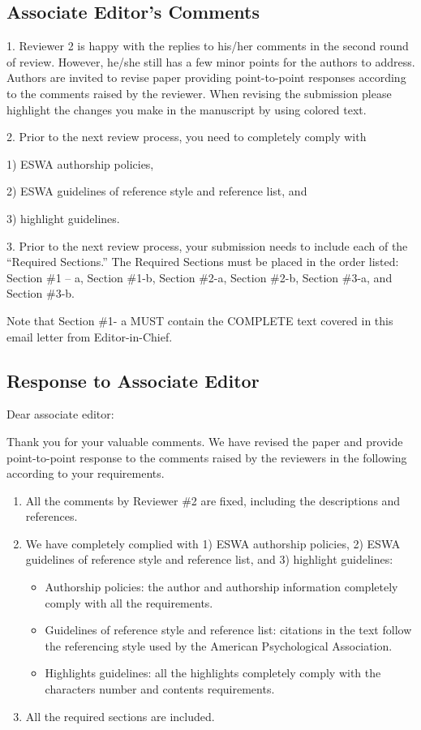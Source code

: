 \documentclass[12pt, review, authoryear]{elsarticle}
\newcounter{reviewer}
\newcounter{point}[reviewer]
\begin{document}
\subsection{Associate Editor’s Comments}
1. Reviewer 2 is happy with the replies to his/her comments in the second round of review. However, he/she still has a few minor points for the authors to address. Authors are invited to revise paper providing point-to-point responses according to the comments raised by the reviewer. When revising the submission please highlight the changes you make in the manuscript by using colored text.

2. Prior to the next review process, you need to completely comply with

1) ESWA authorship policies,

2) ESWA guidelines of reference style and reference list, and

3) highlight guidelines.

3. Prior to the next review process, your submission needs to include each of the “Required Sections.” The Required Sections must be placed in the order listed: Section \#1 – a, Section \#1-b, Section \#2-a, Section \#2-b, Section \#3-a, and Section \#3-b.

Note that Section \#1- a MUST contain the COMPLETE text covered in this email letter from Editor-in-Chief.



\subsection{Response to Associate Editor}
\noindent Dear associate editor:

Thank you for your valuable comments. We have revised the paper and provide point-to-point response to the comments raised by the reviewers in the following according to your requirements.

\begin{enumerate}
  \item All the comments by Reviewer \#2 are fixed, including the descriptions and references.
  \item We have completely complied with 1) ESWA authorship policies,
        2) ESWA guidelines of reference style and reference list, and
        3) highlight guidelines:
        \begin{itemize}
          \item Authorship policies: the author and authorship information completely comply with all the requirements.
          \item Guidelines of reference style and reference list: citations in the text follow the referencing style used by the American Psychological Association.
          \item Highlights guidelines: all the highlights completely comply with the characters  number and contents requirements.
        \end{itemize}
  \item All the required sections are included.
\end{enumerate}
\end{document}
